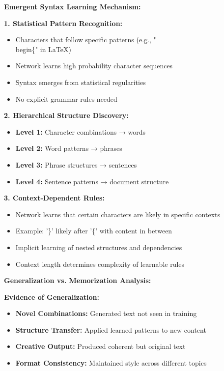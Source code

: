 \documentclass[12pt]{article}
\begin{document}
\begin{enumerate}[(a)]
{    \textbf{Emergent Syntax Learning Mechanism:}
    
    \textbf{1. Statistical Pattern Recognition:}
    \begin{itemize}
        \item Characters that follow specific patterns (e.g., "\\begin\{" in LaTeX)
        \item Network learns high probability character sequences
        \item Syntax emerges from statistical regularities
        \item No explicit grammar rules needed
    \end{itemize}
    
    \textbf{2. Hierarchical Structure Discovery:}
    \begin{itemize}
        \item \textbf{Level 1:} Character combinations → words
        \item \textbf{Level 2:} Word patterns → phrases
        \item \textbf{Level 3:} Phrase structures → sentences
        \item \textbf{Level 4:} Sentence patterns → document structure
    \end{itemize}
    
    \textbf{3. Context-Dependent Rules:}
    \begin{itemize}
        \item Network learns that certain characters are likely in specific contexts
        \item Example: '\}' likely after '\{' with content in between
        \item Implicit learning of nested structures and dependencies
        \item Context length determines complexity of learnable rules
    \end{itemize}
    
    \textbf{Generalization vs. Memorization Analysis:}
    
    \textbf{Evidence of Generalization:}
    \begin{itemize}
        \item \textbf{Novel Combinations:} Generated text not seen in training
        \item \textbf{Structure Transfer:} Applied learned patterns to new content
        \item \textbf{Creative Output:} Produced coherent but original text
        \item \textbf{Format Consistency:} Maintained style across different topics
    \end{itemize}
    
}
\end{enumerate}
\end{document}
